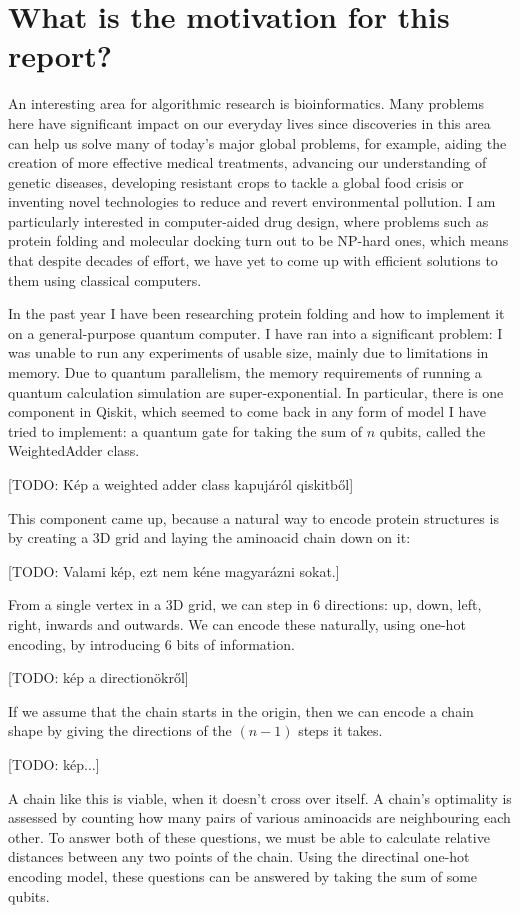 \section{What is the motivation for this report?}

An interesting area for algorithmic research is bioinformatics. Many problems here have significant impact on our everyday lives since discoveries in this area can help us solve many of today’s major global problems, for example, aiding the creation of more effective medical treatments, advancing our understanding of genetic diseases, developing resistant crops to tackle a global food crisis or inventing novel technologies to reduce and revert environmental pollution. I am particularly interested in computer-aided drug design, where problems such as protein folding and molecular docking turn out to be NP-hard ones, which means that despite decades of effort, we have yet to come up with efficient solutions to them using classical computers.

In the past year I have been researching protein folding and how to implement it on a general-purpose quantum computer. I have ran into a significant problem: I was unable to run any experiments of usable size, mainly due to limitations in memory. Due to quantum parallelism, the memory requirements of running a quantum calculation simulation are super-exponential. In particular, there is one component in Qiskit, which seemed to come back in any form of model I have tried to implement: a quantum gate for taking the sum of $n$ qubits, called the WeightedAdder class. 

[TODO: Kép a weighted adder class kapujáról qiskitből]

This component came up, because a natural way to encode protein structures is by creating a 3D grid and laying the aminoacid chain down on it:

[TODO: Valami kép, ezt nem kéne magyarázni sokat.]

From a single vertex in a 3D grid, we can step in $6$ directions: up, down, left, right, inwards and outwards. We can encode these naturally, using one-hot encoding, by introducing $6$ bits of information.

[TODO: kép a directionökről]

If we assume that the chain starts in the origin, then we can encode a chain shape by giving the directions of the $(n-1)$ steps it takes.

[TODO: kép...]

A chain like this is viable, when it doesn't cross over itself. A chain's optimality is assessed by counting how many pairs of various aminoacids are neighbouring each other. To answer both of these questions, we must be able to calculate relative distances between any two points of the chain. Using the directinal one-hot encoding model, these questions can be answered by taking the sum of some qubits.

